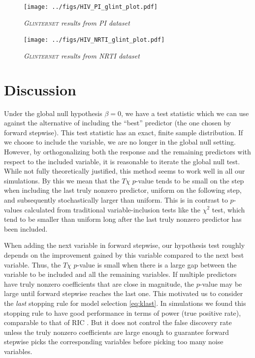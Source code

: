 \documentclass{imsart}
\begin{document}
\begin{figure}[!htp]
\begin{center}
\texttt{[image: ../figs/HIV\_PI\_glint\_plot.pdf]}
\caption{\small \it \textsc{Glinternet} results from PI dataset}
\label{fig:HIVPI:glint}
\end{center}
\end{figure}

\begin{figure}[!htp]
\begin{center}
\texttt{[image: ../figs/HIV\_NRTI\_glint\_plot.pdf]}
\caption{\small \it \textsc{Glinternet} results from NRTI dataset}
\label{fig:HIVNRTI:glint}
\end{center}
\end{figure}





\section{Discussion}
\label{sec:discuss}

Under the global null hypothesis $\beta = 0$, we have a test statistic
which we can use against the alternative of including the ``best''
predictor (the one chosen by forward stepwise).
This test statistic has an exact, finite sample distribution.
If we choose to include the variable, we are no longer in the global null
setting. However, by orthogonalizing both the response and the remaining
predictors with respect to the included variable, it is reasonable to
iterate the global null test. While not fully theoretically justified,
this method seems to work well in all our simulations. By this we mean that
the $T\chi$ $p$-value tends to be small on the step when including the last truly
nonzero predictor, uniform on the following step, and subsequently
stochastically larger than uniform. This is in contrast to $p$-values
calculated from traditional variable-inclusion tests like the $\chi^2$
test, which tend to be smaller than uniform long after the last truly
nonzero predictor has been included.

When adding the next variable in forward stepwise, our hypothesis test
roughly depends on the improvement gained by this variable compared to
the next best variable. Thus, the $T\chi$ $p$-value is small when there is a large
gap between the variable to be included and all the remaining variables.
If multiple predictors have truly nonzero coefficients that are close
in magnitude, the $p$-value may be large until forward stepwise reaches
the last one. This motivated us to consider the \textit{last} stopping
rule for model selection \eqref{eq:klast}. In simulations we
found this stopping rule to have good performance in terms of power
(true positive rate), comparable to that of RIC \citep{RIC}.
But it does not control the false discovery rate
unless the truly nonzero coefficients are large enough to guarantee
forward stepwise picks the corresponding variables before picking too
many noise variables.
\end{document}
